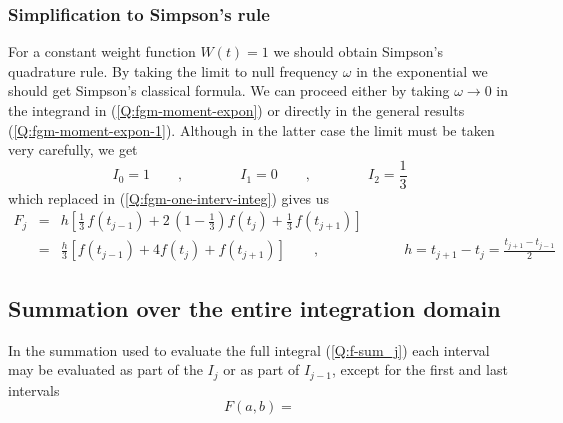 \subsubsection{Simplification to Simpson's rule}
\label{S:simpl-simps-rule}
For a constant weight function $W(t)=1$ we should obtain Simpson's quadrature rule.
By taking the limit to null frequency $\omega$ in the exponential we should get  Simpson's classical formula. We can proceed either by taking $\omega\to 0$ in the integrand in (\ref{Q:fgm-moment-expon}) or directly in the general results (\ref{Q:fgm-moment-expon-1}). Although in the latter case the limit must be taken very carefully, we get
\begin{equation*}
  I_{0}= 1 \qquad , \qquad \qquad I_{1}= 0  \qquad , \qquad \qquad I_{2}= \frac{1}{3}
\end{equation*}
which replaced in (\ref{Q:fgm-one-interv-integ}) gives us
\begin{eqnarray*}
  F_{j}&=& h \left[ \frac{1}{3} \, f(t_{j-1}) + 2\,\left( 1 - \frac{1}{3} \right) f(t_{j}) + \frac{1}{3} \, f(t_{j+1}) \right] \\
  &=& \frac{h}{3} \left[f(t_{j-1}) + 4 f(t_{j})+ f(t_{j+1})  \right] \qquad ,\qquad \qquad \qquad h= t_{j+1}-t_{j}= \frac{t_{j+1}-t_{j-1}}{2}
\end{eqnarray*}
 

\subsection{Summation over the entire integration domain}
\label{S:summ-entire-domain}

In the summation used to evaluate the full integral (\ref{Q:f-sum_j}) each interval may be evaluated as part of the $I_{j}$ or as part of $I_{j-1}$, except for the first and last intervals
\begin{equation*}
  F(a,b)= 
\end{equation*}
